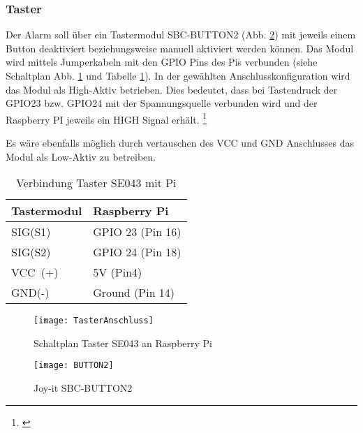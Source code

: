 \documentclass[a4paper,12pt]{article}
\begin{document}
\subsubsection{Taster}

Der Alarm soll über ein Tastermodul SBC-BUTTON2 (Abb. \ref{BUTTON2}) mit jeweils einem Button deaktiviert beziehungsweise manuell aktiviert werden können.
Das Modul wird mittels Jumperkabeln mit den GPIO Pins des Pis verbunden (siehe Schaltplan Abb. \ref{TasterAnschluss} und Tabelle \ref{TasterTabelle}). 
In der gewählten Anschlusskonfiguration wird das Modul als High-Aktiv betrieben. Dies bedeutet, dass bei Tastendruck der GPIO23 bzw. GPIO24 mit der Spannungsquelle verbunden wird und der Raspberry PI jeweils ein HIGH Signal erhält. \footnote{\cite{.19.04.2022}}\par 
Es wäre ebenfalls möglich durch vertauschen des VCC und GND Anschlusses das Modul als Low-Aktiv zu betreiben.

\begin{table}[H]
	\centering
	\begin{tabular}{|p{5cm}|p{5cm}|} 
		\hline
		Tastermodul & Raspberry Pi\\ 
		\hline
		SIG(S1)                   & GPIO 23 \hspace{0,3cm}(Pin 16)\\
		\hline
		SIG(S2)                   & GPIO 24 \hspace{0,3cm}(Pin 18)\\
		\hline
		VCC~(+)   & 5V \hspace{1,45cm}(Pin\hspace{0,35cm}4)\\ 
		\hline
		GND(-)                   & Ground \hspace{0,6cm}(Pin 14)\\
		\hline
		
\end{tabular}
	\caption{Verbindung Taster SE043 mit Pi}
	\label{TasterTabelle}
\end{table}

	\begin{figure}[H]
	\centering
	\texttt{[image: TasterAnschluss]}
	\caption{Schaltplan Taster SE043 an Raspberry Pi}
	\label{TasterAnschluss}
	\end{figure}

	\begin{figure}[h] %
	\centering
	\texttt{[image: BUTTON2]}
	\caption{Joy-it SBC-BUTTON2 \cite{reicheltelektronikGmbH&amp.21.04.2022b}}
	\label{BUTTON2}
	\end{figure}
\end{document}
